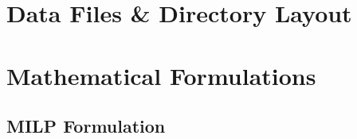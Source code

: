 \appendix

\section{Data Files \& Directory Layout}


% 

% 

% 

\section{Mathematical Formulations}

\subsection{MILP Formulation}

